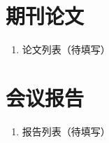 \cleardoublepage
{}

\section*{期刊论文}
\begin{enumerate}
    \item 论文列表（待填写）
\end{enumerate}

\section*{会议报告}
\begin{enumerate}
    \item 报告列表（待填写）
\end{enumerate}
